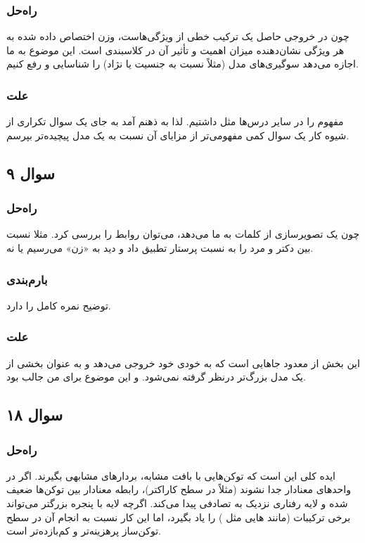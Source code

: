 \documentclass[12pt]{article}
\begin{document}
	\subsubsection*{راه‌حل}
	چون در 
	خروجی حاصل یک ترکیب خطی از ویژگی‌هاست، وزن اختصاص داده شده به هر ویژگی نشان‌دهنده میزان اهمیت و تأثیر آن در کلاسبندی است. این موضوع به ما اجازه می‌دهد سوگیری‌های مدل (مثلاً نسبت به جنسیت یا نژاد) را شناسایی و رفع کنیم.
	\subsubsection*{علت}
	مفهوم 
	را در سایر درس‌ها مثل 
	داشتیم. لذا به ذهنم آمد به جای یک سوال تکراری از شیوه کار 
	یک سوال کمی مفهومی‌تر از مزایای آن نسبت به یک مدل پیچیده‌تر بپرسم.
	\subsection*{سوال ۹}
	\subsubsection*{راه‌حل}
	چون 
	یک 
	تصویرسازی از کلمات به ما می‌دهد، می‌توان روابط را بررسی کرد. مثلا نسبت بین دکتر و مرد را به نسبت پرستار تطبیق داد و دید به «زن» می‌رسیم یا نه. 
	\subsubsection*{بارم‌بندی}
	توضیح نمره کامل را دارد.

	\subsubsection*{علت}
	این بخش از معدود جاهایی است که 
	به خودی خود خروجی می‌دهد و به عنوان بخشی از یک مدل بزرگ‌تر درنظر گرفته نمی‌شود. و این موضوع برای من جالب بود.
	
	\subsection*{سوال ۱۸}
	\subsubsection*{راه‌حل}
	ایده کلی 
	این است که توکن‌هایی با بافت مشابه، بردارهای مشابهی بگیرند. اگر در 
	واحدهای معنادار جدا نشوند (مثلاً در سطح کاراکتر)، رابطه معنادار بین توکن‌ها ضعیف شده و لایه 
	رفتاری نزدیک به تصادفی پیدا می‌کند. اگرچه لایه 
	با پنجره بزرگتر می‌تواند برخی ترکیبات (مانند هایی مثل ) را یاد بگیرد، اما این کار نسبت به انجام آن در سطح توکن‌ساز پرهزینه‌تر و کم‌بازده‌تر است.
\end{document}
